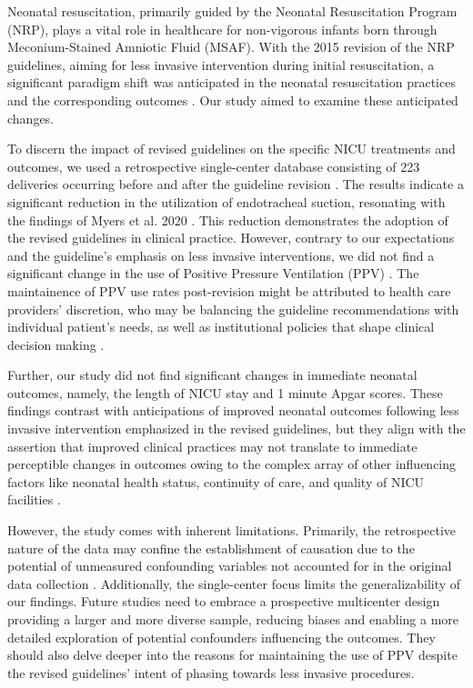 \documentclass[11pt]{article}
\begin{document}
Neonatal resuscitation, primarily guided by the Neonatal Resuscitation Program (NRP), plays a vital role in healthcare for non-vigorous infants born through Meconium-Stained Amniotic Fluid (MSAF)\cite{Thomas2010TeamTI}. With the 2015 revision of the NRP guidelines, aiming for less invasive intervention during initial resuscitation, a significant paradigm shift was anticipated in the neonatal resuscitation practices and the corresponding outcomes \cite{Singhal2012HelpingBB, Myers2020ImpactOT}. Our study aimed to examine these anticipated changes.

To discern the impact of revised guidelines on the specific NICU treatments and outcomes, we used a retrospective single-center database consisting of 223 deliveries occurring before and after the guideline revision \cite{Baergen2001MorbidityMA}. The results indicate a significant reduction in the utilization of endotracheal suction, resonating with the findings of Myers et al. 2020 \cite{Myers2020ImpactOT}. This reduction demonstrates the adoption of the revised guidelines in clinical practice. However, contrary to our expectations and the guideline's emphasis on less invasive interventions, we did not find a significant change in the use of Positive Pressure Ventilation (PPV) \cite{Dol2017TheIO}. The maintainence of PPV use rates post-revision might be attributed to health care providers' discretion, who may be balancing the guideline recommendations with individual patient's needs, as well as institutional policies that shape clinical decision making \cite{Henao-Villada2016ImpactOT, Rovamo2015EffectOA}.

Further, our study did not find significant changes in immediate neonatal outcomes, namely, the length of NICU stay and 1 minute Apgar scores. These findings contrast with anticipations of improved neonatal outcomes following less invasive intervention emphasized in the revised guidelines, but they align with the assertion that improved clinical practices may not translate to immediate perceptible changes in outcomes owing to the complex array of other influencing factors like neonatal health status, continuity of care, and quality of NICU facilities \cite{Xy1997TheIO, Kamath-Rayne2018HelpingBB}.

However, the study comes with inherent limitations. Primarily, the retrospective nature of the data may confine the establishment of causation due to the potential of unmeasured confounding variables not accounted for in the original data collection \cite{Bierlaire2020HowTM}. Additionally, the single-center focus limits the generalizability of our findings. Future studies need to embrace a prospective multicenter design providing a larger and more diverse sample, reducing biases and enabling a more detailed exploration of potential confounders influencing the outcomes. They should also delve deeper into the reasons for maintaining the use of PPV despite the revised guidelines' intent of phasing towards less invasive procedures.
\end{document}
